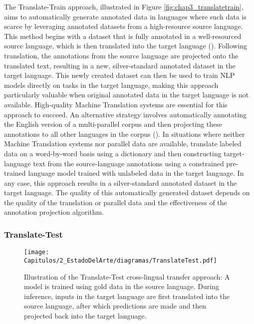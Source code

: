 The Translate-Train approach, illustrated in Figure \ref{fig:chap3_translatetrain},  aims to automatically generate annotated data in languages where such data is scarce by leveraging annotated datasets from a high-resource source language. This method begins with a dataset that is fully annotated in a well-resourced source language, which is then translated into the target language (\citet{DBLP:conf/emnlp/JainPL19,fei-etal-2020-cross}). Following translation, the annotations from the source language are projected onto the translated text, resulting in a new, silver-standard annotated dataset in the target language. This newly created dataset can then be used to train NLP models directly on tasks in the target language, making this approach particularly valuable when original annotated data in the target language is not available. High-quality Machine Translation systems are essential for this approach to succeed. An alternative strategy involves automatically annotating the English version of a multi-parallel corpus and then projecting these annotations to all other languages in the corpus (\citet{Ehrmann}). In situations where neither Machine Translation systems nor parallel data are available, \citet{DBLP:conf/acl/GuoR21} translate labeled data on a word-by-word basis using a dictionary and then constructing target-language text from the source-language annotations using a constrained pre-trained language model trained with unlabeled data in the target language. In any case, this approach results in a silver-standard annotated dataset in the target language. The quality of this automatically generated dataset depends on the quality of the translation or parallel data and the effectiveness of the annotation projection algorithm.



 \subsubsection{Translate-Test}
 
\begin{figure}[ht]
    \centering
    \texttt{[image: Capitulos/2\_EstadoDelArte/diagramas/TranslateTest.pdf]}
    \caption{Illustration of the Translate-Test cross-lingual transfer approach: A model is trained using gold data in the source language. During inference, inputs in the target language are first translated into the source language, after which predictions are made and then projected back into the target language.}
    \label{fig:chap3_translatetest}
\end{figure}

